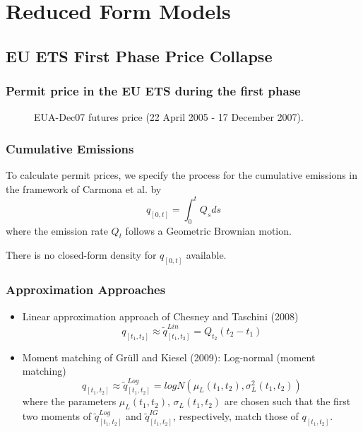 \section{Reduced Form Models}
\subsection{EU ETS First Phase Price Collapse}
\begin{frame}
  \frametitle{Permit price in the EU ETS during the first phase}
\begin{center}
\begin{figure}[h!]
\centering
{}
\caption{EUA-Dec07 futures price (22 April 2005 - 17 December 2007).}
\label{fig:plotCar00-Data}
\end{figure}
\end{center}
\end{frame}


\begin{frame}
  \frametitle{Cumulative Emissions}
    To calculate permit prices, we specify the process for the cumulative emissions in the framework of Carmona et al. by
    $$
      q_{[0,t]} = \int_0^t Q_s ds
    $$
    where the emission rate $Q_t$ follows a Geometric Brownian motion.


  There is no closed-form density for $q_{[0,t]}$ available.

\end{frame}

\begin{frame}
  \frametitle{Approximation Approaches}
\begin{itemize}
\item<1-> Linear approximation approach of Chesney and Taschini (2008)
   $$
     q_{[t_1,t_2]} \approx \tilde{q}^{Lin}_{[t_1,t_2]} = Q_{t_2} (t_2 - t_1)
   $$
\item<2-> Moment matching of Gr{\"u}ll and Kiesel (2009): Log-normal (moment matching)
$$
q_{[t_1,t_2]} \approx \tilde{q}^{Log}_{[t_1,t_2]} = logN \left(\mu_L(t_1,t_2), \sigma^2_L(t_1,t_2) \right) \label{ECumApprox2}
$$
where the parameters $\mu_L(t_1,t_2)$, $\sigma_L(t_1,t_2)$ are chosen such that the first two moments of $\tilde{q}^{Log}_{[t_1,t_2]}$ and $\tilde{q}^{IG}_{[t_1,t_2]}$, respectively, match those of $q_{[t_1,t_2]}$.
\end{itemize}
\end{frame}

